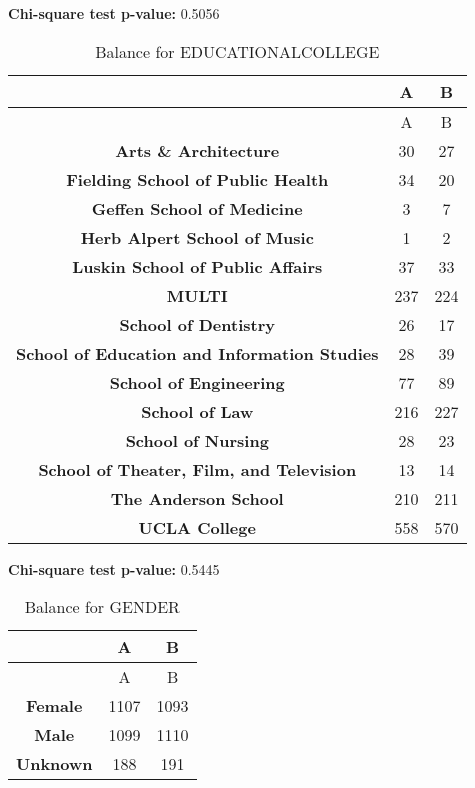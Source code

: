 \documentclass[
]{article}
\begin{document}
\textbf{Chi-square test p-value:} 0.5056\\
\pagebreak

\begin{longtable}[]{@{}ccc@{}}
\caption{Balance for EDUCATIONALCOLLEGE}\tabularnewline
\toprule\noalign{}
~ & A & B \\
\midrule\noalign{}
\endfirsthead
\toprule\noalign{}
~ & A & B \\
\midrule\noalign{}
\endhead
\bottomrule\noalign{}
\endlastfoot
\textbf{Arts \& Architecture} & 30 & 27 \\
\textbf{Fielding School of Public Health} & 34 & 20 \\
\textbf{Geffen School of Medicine} & 3 & 7 \\
\textbf{Herb Alpert School of Music} & 1 & 2 \\
\textbf{Luskin School of Public Affairs} & 37 & 33 \\
\textbf{MULTI} & 237 & 224 \\
\textbf{School of Dentistry} & 26 & 17 \\
\textbf{School of Education and Information Studies} & 28 & 39 \\
\textbf{School of Engineering} & 77 & 89 \\
\textbf{School of Law} & 216 & 227 \\
\textbf{School of Nursing} & 28 & 23 \\
\textbf{School of Theater, Film, and Television} & 13 & 14 \\
\textbf{The Anderson School} & 210 & 211 \\
\textbf{UCLA College} & 558 & 570 \\
\end{longtable}

\textbf{Chi-square test p-value:} 0.5445\\
\pagebreak

\begin{longtable}[]{@{}ccc@{}}
\caption{Balance for GENDER}\tabularnewline
\toprule\noalign{}
~ & A & B \\
\midrule\noalign{}
\endfirsthead
\toprule\noalign{}
~ & A & B \\
\midrule\noalign{}
\endhead
\bottomrule\noalign{}
\endlastfoot
\textbf{Female} & 1107 & 1093 \\
\textbf{Male} & 1099 & 1110 \\
\textbf{Unknown} & 188 & 191 \\
\end{longtable}
\end{document}
